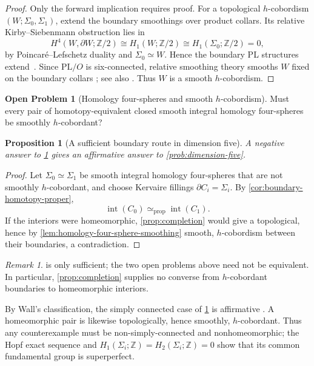 \documentclass[10pt,reqno]{amsart}
\numberwithin{equation}{section}
\newtheorem{proposition}{Proposition}
\theoremstyle{definition}
\newtheorem{problem}{Open Problem}
\theoremstyle{remark}
\newtheorem{remark}{Remark}
\newcommand{\Z}{\mathbb Z}
\newcommand{\PL}{\mathrm{PL}}
\newcommand{\Int}{\operatorname{int}}
\newcommand{\simeqp}{\simeq_{\mathrm{prop}}}
\begin{document}
\begin{proof}
Only the forward implication requires proof.  For a topological
\(h\)-cobordism \((W;\Sigma_0,\Sigma_1)\), extend the boundary smoothings
over product collars.  Its relative Kirby--Siebenmann obstruction lies
in
\[
H^4(W,\partial W;\Z/2)
\cong H_1(W;\Z/2)
\cong H_1(\Sigma_0;\Z/2)
=0,
\]
by Poincar\'e--Lefschetz duality and \(\Sigma_0\simeq W\).  Hence the
boundary PL structures extend~\cite{KirbySiebenmann}.  Since \(\PL/O\)
is six-connected, relative smoothing theory smooths \(W\) fixed on the
boundary collars
\cite[Theorem~2.1]{DaherPowellSmoothing}; see also
\cite{MadsenMilgram}.  Thus \(W\) is a smooth \(h\)-cobordism.
\end{proof}

\begin{problem}[Homology four-spheres and smooth \(h\)-cobordism]
\label{prob:homology-four-sphere-hcobordism}
Must every pair of homotopy-equivalent closed smooth integral homology
four-spheres be smoothly \(h\)-cobordant?
\end{problem}

\begin{proposition}[A sufficient boundary route in dimension five]
\label{prop:homology-four-sphere-to-dimension-five}
A negative answer to
\cref{prob:homology-four-sphere-hcobordism} gives an affirmative answer
to \cref{prob:dimension-five}.
\end{proposition}

\begin{proof}
Let \(\Sigma_0\simeq\Sigma_1\) be smooth integral homology four-spheres
that are not smoothly \(h\)-cobordant, and choose Kervaire fillings
\(\partial C_i=\Sigma_i\).  By
\cref{cor:boundary-homotopy-proper},
\[
\Int(C_0)\simeqp\Int(C_1).
\]
If the interiors were homeomorphic, \cref{prop:completion} would give a
topological, hence by \cref{lem:homology-four-sphere-smoothing} smooth,
\(h\)-cobordism between their boundaries, a contradiction.
\end{proof}

\begin{remark}
 is only sufficient;
the two open problems above need not be equivalent.  In particular,
\cref{prop:completion} supplies no converse from \(h\)-cobordant
boundaries to homeomorphic interiors.

By Wall's classification, the simply connected case of
\cref{prob:homology-four-sphere-hcobordism} is affirmative
\cite[Theorem~2]{WallSimplyConnected}.  A homeomorphic pair is likewise
topologically, hence smoothly, \(h\)-cobordant.  Thus any counterexample
must be non-simply-connected and nonhomeomorphic; the Hopf exact
sequence and \(H_1(\Sigma_i;\Z)=H_2(\Sigma_i;\Z)=0\) show that its
common fundamental group is superperfect.
\end{remark}




\end{document}
